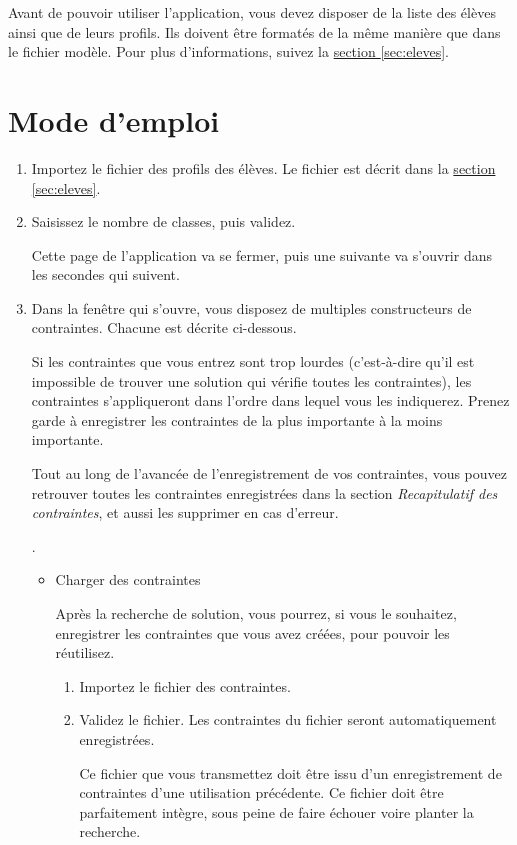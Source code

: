 \documentclass[11pt,a4paper]{article}
\begin{document}
\begin{astuce}
Avant de pouvoir utiliser l'application, vous devez disposer de la liste des élèves ainsi que de leurs profils. Ils doivent être formatés de la même manière que dans le fichier modèle. Pour plus d'informations, suivez la \hyperref[sec:eleves]{section \ref{sec:eleves}}.
\end{astuce}

\section{Mode d'emploi}
\label{sec:emploi}
\begin{enumerate}
  \item Importez le fichier des profils des élèves. Le fichier est décrit dans la \hyperref[sec:eleves]{section \ref{sec:eleves}}.
  \item Saisissez le nombre de classes, puis validez. \begin{note}Cette page de l'application va se fermer, puis une suivante va s'ouvrir dans les secondes qui suivent.\end{note}
  \item Dans la fenêtre qui s'ouvre, vous disposez de multiples constructeurs de contraintes. Chacune est décrite ci-dessous.\begin{attention}Si les contraintes que vous entrez sont trop lourdes (c'est-à-dire qu'il est impossible de trouver une solution qui vérifie toutes les contraintes), les contraintes s'appliqueront dans l'ordre dans lequel vous les indiquerez. Prenez garde à enregistrer les contraintes de la plus importante à la moins importante.\end{attention}\begin{note}Tout au long de l'avancée de l'enregistrement de vos contraintes, vous pouvez retrouver toutes les contraintes enregistrées dans la section \textit{Recapitulatif des contraintes}, et aussi les supprimer en cas d'erreur.\end{note}.
  \begin{itemize}
    \item Charger des contraintes \begin{note}Après la recherche de solution, vous pourrez, si vous le souhaitez, enregistrer les contraintes que vous avez créées, pour pouvoir les réutilisez.\end{note}
    \begin{enumerate}
      \item Importez le fichier des contraintes.
      \item Validez le fichier. Les contraintes du fichier seront automatiquement enregistrées. \begin{danger}Ce fichier que vous transmettez doit être issu d'un enregistrement de contraintes d'une utilisation précédente. Ce fichier doit être parfaitement intègre, sous peine de faire échouer voire planter la recherche.\end{danger}

\end{enumerate}
\end{itemize}
\end{enumerate}
\end{document}
